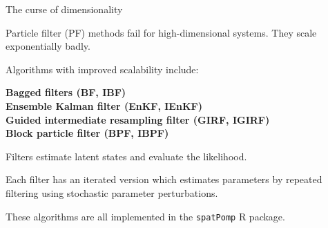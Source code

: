 \documentclass{beamer}
\begin{document}
\begin{frame}{The curse of dimensionality}

  \bi
  \item
    Particle filter (PF) methods fail for high-dimensional systems. They scale exponentially badly.

    \vspace{2mm}
    
  \item Algorithms with improved scalability include:\\

    \vspace{1mm}
    
  {\bf
  Bagged filters (BF, IBF)\\
  Ensemble Kalman filter (EnKF, IEnKF)\\
  Guided intermediate resampling filter (GIRF, IGIRF)\\
  Block particle filter (BPF, IBPF)\\
  }

      \vspace{2mm}

\item Filters estimate latent states and evaluate the likelihood.

    \vspace{2mm}

  \item Each filter has an iterated version which estimates parameters by repeated filtering using stochastic parameter perturbations.

        \vspace{2mm}

\item These algorithms are all implemented in the \texttt{spatPomp} R package.
  
  \ei
  
\end{frame}
\end{document}
